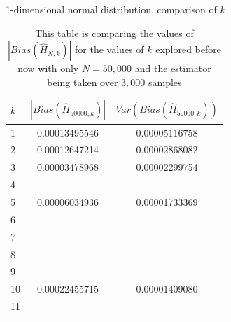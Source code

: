 \documentclass{article}
\begin{document}
\begin{table}
\caption{1-dimensional normal distribution, comparison of $k$} \label{normal_kcompare2_table}
\begin{center}
\begin{tabular}{| l | c c |} 
\toprule
$k$ &  $|Bias(\hat{H}_{50000, k})|$ & $Var(Bias(\hat{H}_{50000, k}))$ \\
\midrule[1pt]
1      & 0.00013495546     & 0.00005116758  \\
2      & 0.00012647214     & 0.00002868082  \\
3      & 0.00003478968     & 0.00002299754  \\
4      &   &      \\
5      & 0.00006034936     & 0.00001733369  \\
6      &   &      \\
7      &   &      \\
8      &   &      \\
9      &   &      \\
10    & 0.00022455715     & 0.00001409080  \\
11    &   &      \\
\hline
\end{tabular}
\\[10pt]
\caption*{This table is comparing the values of $|Bias(\hat{H}_{N, k})|$ for the values of $k$ explored before now with only $N=50,000$ and the estimator being taken over $3,000$ samples}
\end{center}
\end{table}
\end{document}
